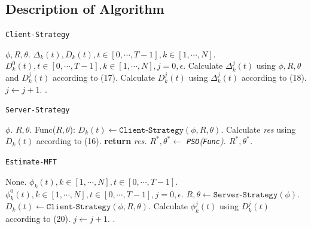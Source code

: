 \documentclass{article}
\theoremstyle{plain}
\theoremstyle{definition}
\theoremstyle{remark}
\begin{document}
\subsection{Description of Algorithm}

 \begin{algorithm}[tb]
    \caption{\texttt{Client-Strategy}}
    \begin{algorithmic}[1]
         $\phi, R, \theta$.
         $\Delta_k(t), D_k(t), t \in [0, \cdots, T -1], k \in [1, \cdots, N]$.
         $D_k^0(t), t \in [0, \cdots, T - 1], k \in [1, \cdots, N], j=0, \epsilon$.
        \REPEAT
                    \STATE Calculate $\Delta_k^j(t)$ using $\phi, R, \theta$ and $D_k^j(t)$ according to (17).
                    \STATE Calculate $D_k^j(t)$ using $\Delta_k^j(t)$ according to (18).
                \ENDFOR
            \ENDFOR
            \STATE $j \gets j + 1.$
        .
    \end{algorithmic}
 \end{algorithm}

 \begin{algorithm}[tb]
    \caption{\texttt{Server-Strategy}}
    \begin{algorithmic}[1]
         $\phi$.
         $R, \theta$.
         Func($R, \theta$):
        \STATE \hspace{1em} $D_k(t) \gets \texttt{Client-Strategy}(\phi, R, \theta)$.
        \STATE \hspace{1em} Calculate {\it res} using $D_k(t)$ according to (16).
        \STATE \hspace{1em} {\bfseries return} \it{res}.
        \STATE $R^*, \theta^* \gets$ \texttt{PSO}(\texttt{Func}).
         $R^*, \theta^*$.
    \end{algorithmic}
\end{algorithm}

\begin{algorithm}[tb]
    \caption{\texttt{Estimate-MFT}}
    \begin{algorithmic}[1]
         None.
         $\phi_k(t), k \in [1, \cdots, N], t \in [0, \cdots, T - 1]$.
         $\phi_k^0(t), k \in [1, \cdots, N], t \in [0, \cdots, T - 1], j=0, \epsilon$.
        \REPEAT
            \STATE $R, \theta \gets \texttt{Server-Strategy}(\phi)$.
            \STATE $D_k(t) \gets \texttt{Client-Strategy}(\phi, R, \theta)$.
                \STATE Calculate $\phi_k^j(t)$ using $D_k^j(t)$ according to (20).
            \ENDFOR
            \STATE $j \gets j + 1.$
        .
    \end{algorithmic}
 \end{algorithm}
\end{document}
